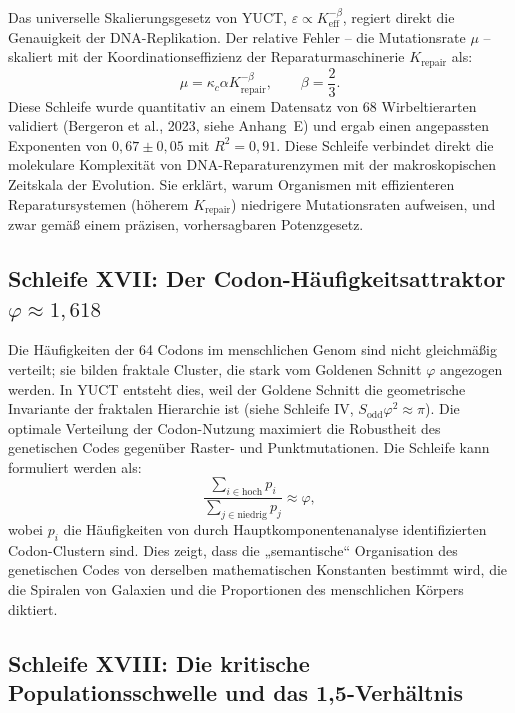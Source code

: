 \documentclass[12pt]{article}
\begin{document}
	Das universelle Skalierungsgesetz von YUCT, \(\varepsilon \propto K_{\mathrm{eff}}^{-\beta}\), regiert direkt die Genauigkeit der DNA-Replikation. Der relative Fehler – die Mutationsrate \(\mu\) – skaliert mit der Koordinationseffizienz der Reparaturmaschinerie \(K_{\mathrm{repair}}\) als:
	\begin{equation}
		\boxed{ \mu = \kappa_c \alpha K_{\mathrm{repair}}^{-\beta}, \qquad \beta = \frac{2}{3} }.
	\end{equation}
	Diese Schleife wurde quantitativ an einem Datensatz von 68 Wirbeltierarten validiert (Bergeron et al., 2023, siehe Anhang~E) und ergab einen angepassten Exponenten von \(0,67 \pm 0,05\) mit \(R^2 = 0,91\). Diese Schleife verbindet direkt die molekulare Komplexität von DNA-Reparaturenzymen mit der makroskopischen Zeitskala der Evolution. Sie erklärt, warum Organismen mit effizienteren Reparatursystemen (höherem \(K_{\mathrm{repair}}\)) niedrigere Mutationsraten aufweisen, und zwar gemäß einem präzisen, vorhersagbaren Potenzgesetz.
	
	\subsection{Schleife XVII: Der Codon-Häufigkeitsattraktor \(\varphi \approx 1,618\)}
	
	Die Häufigkeiten der 64 Codons im menschlichen Genom sind nicht gleichmäßig verteilt; sie bilden fraktale Cluster, die stark vom Goldenen Schnitt \(\varphi\) angezogen werden. In YUCT entsteht dies, weil der Goldene Schnitt die geometrische Invariante der fraktalen Hierarchie ist (siehe Schleife IV, \(S_{\mathrm{odd}}\varphi^2 \approx \pi\)). Die optimale Verteilung der Codon-Nutzung maximiert die Robustheit des genetischen Codes gegenüber Raster- und Punktmutationen. Die Schleife kann formuliert werden als:
	\begin{equation}
		\boxed{ \frac{\sum_{i \in \text{hoch}} p_i}{\sum_{j \in \text{niedrig}} p_j} \approx \varphi },
	\end{equation}
	wobei \(p_i\) die Häufigkeiten von durch Hauptkomponentenanalyse identifizierten Codon-Clustern sind. Dies zeigt, dass die „semantische“ Organisation des genetischen Codes von derselben mathematischen Konstanten bestimmt wird, die die Spiralen von Galaxien und die Proportionen des menschlichen Körpers diktiert.
	
	\subsection{Schleife XVIII: Die kritische Populationsschwelle und das 1,5-Verhältnis}
	
\end{document}
